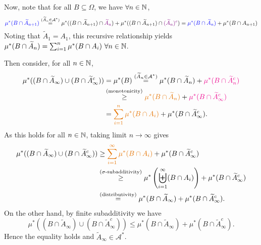 \begin{enumerate}
\begin{pf}
\begin{itemize}
\begin{enumerate}[label={(\arabic*)}]
Now, note that for all \(B\subseteq \Omega\), we have \(\forall n\in\mathbb{N}\),
\[
\blc{\mu^*(B\cap\widetilde{A}_{n+1})}
\overset{(\widetilde{A}_{n}\in\mathcal{A}^*)}{=}
\mu^*((B\cap\widetilde{A}_{n+1})\cap \vc{\widetilde{A}_{n}})
+\mu^*((B\cap\widetilde{A}_{n+1})\cap \vc{(\widetilde{A}_{n})^c})
=\blc{\mu^*(B\cap\widetilde{A}_n)}+\mu^*(B\cap A_{n+1})
\]
Noting that \(\widetilde{A}_{1}=A_1\), this recursive relationship yields
\(\mu^*(B\cap\widetilde{A}_{n})=\sum_{i=1}^{n}\mu^*(B\cap A_i)~\forall
n\in\mathbb{N}\).

Then consider, for all \(n\in\mathbb{N}\),
\begin{align*}
\mu^*((B\cap\widetilde{A}_{\infty})\cup(B\cap\widetilde{A}_{\infty}^{c}))
&=\mu^*(B)
\overset{(\widetilde{A}_{n}\in\mathcal{A}^*)}{=}
\mu^*(B\cap\widetilde{A}_n)+\mgc{\mu^*(B\cap\widetilde{A}_n^{c})} \\
&\overset{\text{(monotonicity)}}{\ge}
\orc{\mu^*(B\cap\widetilde{A}_n)}+\mgc{\mu^*(B\cap\widetilde{A}_{\infty}^{c})} \\
&=\orc{\sum_{i=1}^{n}\mu^*(B\cap A_i)}+\mu^*(B\cap\widetilde{A}_{\infty}^{c}).
\end{align*}
As this holds for all \(n\in\mathbb{N}\), taking limit \(n\to\infty\) gives
\begin{align}
\label{eq:mu-star-geq-sum}\mu^*((B\cap\widetilde{A}_{\infty})\cup(B\cap\widetilde{A}_{\infty}^{c}))
&\ge\orc{\sum_{i=1}^{\infty}\mu^*(B\cap A_i)}+\mu^*(B\cap\widetilde{A}_{\infty}^{c}) \\
\nonumber&\overset{\text{(\(\sigma\)-subadditivity)}}{\ge}
\mu^*\left(\biguplus_{i=1}^{\infty}(B\cap A_i)\right)+\mu^*(B\cap\widetilde{A}_{\infty}^{c}) \\
\nonumber&\overset{\text{(distributivity)}}{=}\mu^*(B\cap\widetilde{A}_{\infty})+\mu^*(B\cap\widetilde{A}_{\infty}^{c}).
\end{align}
On the other hand, by finite subadditivity we have
\[
\mu^*((B\cap\widetilde{A}_{\infty})\cup(B\cap\widetilde{A}_{\infty}^{c}))
\le\mu^*(B\cap\widetilde{A}_{\infty})+\mu^*(B\cap\widetilde{A}_{\infty}^{c}).
\]
Hence the equality holds and \(\widetilde{A}_{\infty}\in\mathcal{A}^*\).
\end{enumerate}
\end{itemize}

\end{pf}
\end{enumerate}
